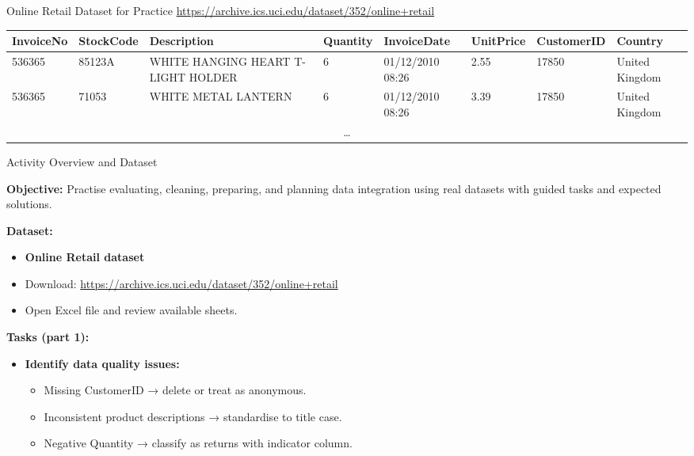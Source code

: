 \documentclass[aspectratio=169, table]{beamer}
\begin{document}
\begin{frame}{Online Retail Dataset for Practice}
	\vspace{10pt}
	\url{https://archive.ics.uci.edu/dataset/352/online+retail}
	
	\vspace{10pt}

	\renewcommand{\arraystretch}{1.2}
	\setlength{\arrayrulewidth}{0.3mm} %
	\centering
		\scriptsize
	\begin{tabular}{|p{}|p{}|p{}|p{}|p{}|p{}|p{}|p{}|}
		\hline
		\textbf{InvoiceNo} & \textbf{StockCode} & \textbf{Description} & \textbf{Quantity} & \textbf{InvoiceDate} & \textbf{UnitPrice} & \textbf{CustomerID} & \textbf{Country} \\
		\hline
		536365 & 85123A & WHITE HANGING HEART T-LIGHT HOLDER & 6 & 01/12/2010 08:26 & 2.55 & 17850 & United Kingdom \\
		\hline
		536365 & 71053 & WHITE METAL LANTERN & 6 & 01/12/2010 08:26 & 3.39 & 17850 & United Kingdom \\
		\hline
		\multicolumn{8}{c}{\ldots} \\
		\hline
	\end{tabular}
\end{frame}


\begin{frame}{Activity Overview and Dataset}
	\vspace{20pt}
	
	\textbf{Objective:} Practise evaluating, cleaning, preparing, and planning data integration using real datasets with guided tasks and expected solutions.
	
	\textbf{Dataset:}
	\begin{itemize}
		\item \textbf{Online Retail dataset}
		\item Download: \url{https://archive.ics.uci.edu/dataset/352/online+retail}
		\item Open Excel file and review available sheets.
	\end{itemize}
	
	\textbf{Tasks (part 1):}
	\begin{itemize}
		\item \textbf{Identify data quality issues:}
		\begin{itemize}
			\item Missing CustomerID → delete or treat as anonymous.
			\item Inconsistent product descriptions → standardise to title case.
			\item Negative Quantity → classify as returns with indicator column.
		\end{itemize}
	\end{itemize}
	
\end{frame}
\end{document}

